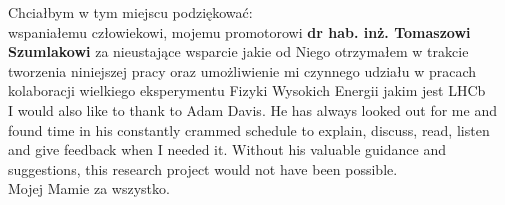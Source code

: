 \noindent Chciałbym w tym miejscu podziękować:\\
wspaniałemu człowiekowi, mojemu promotorowi \textbf{dr hab. inż. Tomaszowi Szumlakowi}  za nieustające wsparcie jakie od Niego otrzymałem w trakcie tworzenia niniejszej pracy oraz umożliwienie mi czynnego udziału w pracach  kolaboracji wielkiego eksperymentu Fizyki Wysokich Energii jakim jest LHCb\\
I would also like to thank to Adam Davis. He has always looked out for me and found time in his constantly crammed schedule to explain, discuss, read, listen and give feedback when I needed it. Without his valuable guidance and suggestions, this research project would not have been possible. \\
Mojej Mamie za wszystko. 

